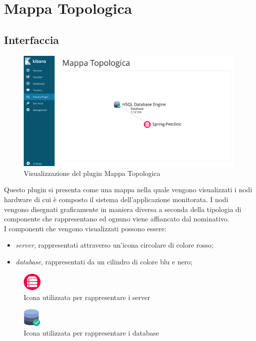 \newpage
\section{Mappa Topologica}
\label{sec:mtopologica}
\subsection{Interfaccia}

\begin{figure}[H]
	\centering 
	\includegraphics[width=1\textwidth]{Images/mappa}
	\caption{Visualizzazione del plugin Mappa Topologica}
\end{figure}

Questo plugin si presenta come una mappa nella quale vengono visualizzati i nodi hardware di cui è composto il sistema dell'applicazione monitorata. 
I nodi vengono disegnati graficamente in maniera diversa a seconda della tipologia di componente che rappresentano ed ognuno viene affiancato dal nominativo. 
\\ I componenti che vengono visualizzati possono essere:
\begin{itemize}
	\item \emph{server}, rappresentati attraverso un'icona circolare di colore rosso;
	\item \emph{database}, rappresentati da un cilindro di colore blu e nero;
\end{itemize}
\begin{figure}[H]
	\centering 
	\includegraphics[width=0.08\textwidth]{Images/server.png}
	\caption{Icona utilizzata per rappresentare i server}
	\label{server} 
\end{figure}
\begin{figure}[H]
	\centering 
	\includegraphics[width=0.08\textwidth]{Images/database.png}
	\caption{Icona utilizzata per rappresentare i database}
	\label{database} 
\end{figure}

